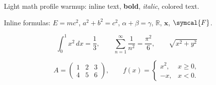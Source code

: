 


\begin{preview}

Light math profile warmup: inline text, \textbf{bold}, \textit{italic},
{\color{blue}colored text}.

Inline formulas:
$E=mc^2$, $a^2+b^2=c^2$, $\alpha+\beta=\gamma$,
$\mathbb{R}$, $\symbf{x}$, $\symcal{F}$.

\[
  \int_0^1 x^2\,dx=\frac{1}{3},\qquad
  \sum_{n=1}^{\infty}\frac{1}{n^2}=\frac{\pi^2}{6},\qquad
  \sqrt{x^2+y^2}
\]

\[
  A =
  \begin{pmatrix}
    1 & 2 & 3\\
    4 & 5 & 6
  \end{pmatrix},
  \qquad
  f(x)=
  \begin{cases}
    x^2, & x \ge 0,\\
    -x, & x < 0.
  \end{cases}
\]

\end{preview}

